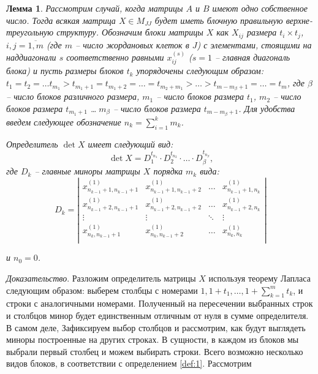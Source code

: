 \documentclass[11pt, a4paper]{article}
\newtheorem{lemm}{Лемма}
\begin{document}
\begin{lemm} \label{lemm:1}
    Рассмотрим случай, когда матрицы $A$ и $B$ имеют одно собственное число. Тогда всякая матрица
    $X \in M_{JJ}$ будет иметь блочную правильную верхне-треугольную структуру. Обозначим блоки матрицы $X$ как
    $X_{ij}$ размера $t_i \times t_j$, $i, j = \overline{1, m}$ (где $m$ -- число жордановых клеток в $J$) с элементами, стоящими на наддиагонали $s$ соответственно равными $x_{ij}^{(s)}$ ($s = 1$ -- главная диагональ блока) 
    и пусть размеры блоков $t_k$ упорядочены следующим образом: $t_1 = t_2 = \dots t_{m_1} > 
    t_{m_1 + 1} = t_{m_1 + 2} = \dots = t_{m_2 + m_1} > \dots > t_{m - m_{\beta} + 1} = \dots = t_{m}$,
    где $\beta$ -- число блоков различного размера, $m_1$ -- число блоков размера $t_1$,
    $m_2$ -- число блоков размера $t_{m_1 + 1}$ \ldots $\; m_{\beta}$ -- число блоков размера $t_{m - m_{\beta} + 1}$.
    Для удобства введем следующее обозначение $n_{k} = \displaystyle\sum_{i=1}^{k}m_{k}$.

    Определитель $\det X$ имеет следующий вид:
    $$ \det X = D_{1}^{t_{n_1}} \cdot D_{2}^{t_{n_2}} \cdot \ldots \cdot D_{\beta}^{t_{n_\beta}}\text{,}$$
    где $D_{k}$ -- главные миноры матрицы $X$ порядка $m_{k}$ вида:
    $$ D_{k} = \left|\begin{matrix}
        x_{n_{k-1} + 1,n_{k-1} + 1}^{(1)} & x_{n_{k-1} + 1,n_{k-1} + 2}^{(1)} & \dots & x_{n_{k-1} + 1, n_{k}}^{(1)}\\
        x_{n_{k-1} + 2,n_{k-1} + 1}^{(1)} & x_{n_{k-1} + 2,n_{k-1} + 2}^{(1)} & \dots & x_{n_{k-1} + 2, n_{k}}^{(1)}\\
        \vdots & \vdots & \ddots & \vdots\\
        x_{n_{k},n_{k-1} + 1}^{(1)} & x_{n_{k},n_{k-1} + 2}^{(1)} & \dots & x_{n_{k}, n_{k}}^{(1)}\\
    \end{matrix}\right|$$

    и $n_0 = 0$.
\end{lemm}
\textit{Доказательство}. Разложим определитель матрицы $X$ используя теорему Лапласа следующим образом: 
выберем столбцы с номерами $1, 1 + t_1, \dots, 1 + \displaystyle \sum_{k = 1}^{m}{t_k}$, и строки с аналогичными номерами. 
Полученный на пересечении выбранных строк и столбцов минор будет единственным отличным от нуля в сумме определителя. В самом деле,
Зафиксируем выбор столбцов и рассмотрим, как будут выглядеть миноры построенные на других строках. В сущности, в каждом из блоков мы 
выбрали первый столбец и можем выбирать строки. Всего возможно несколько видов блоков, в соответствии с определением \ref{def:1}. Рассмотрим
\end{document}
